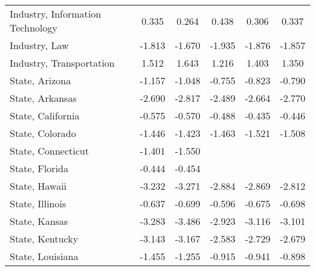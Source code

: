 {\begin{center}
{\begin{longtable}{l*{5}{c}}
\addlinespace
Industry, Information Technology&       0.335         &       0.264         &       0.438\sym{*}  &       0.306         &       0.337         \\
\addlinespace
Industry, Law            &      -1.813\sym{***}&      -1.670\sym{**} &      -1.935\sym{***}&      -1.876\sym{***}&      -1.857\sym{***}\\
\addlinespace
Industry, Transportation &       1.512\sym{*}  &       1.643\sym{**} &       1.216         &       1.403\sym{*}  &       1.350\sym{*}  \\
\addlinespace
State, Arizona           &      -1.157\sym{**} &      -1.048\sym{**} &      -0.755         &      -0.823\sym{*}  &      -0.790         \\
\addlinespace
State, Arkansas          &      -2.690\sym{***}&      -2.817\sym{***}&      -2.489\sym{***}&      -2.664\sym{***}&      -2.770\sym{***}\\
\addlinespace
State, California        &      -0.575\sym{*}  &      -0.570\sym{**} &      -0.488\sym{*}  &      -0.435         &      -0.446         \\
\addlinespace
State, Colorado          &      -1.446\sym{**} &      -1.423\sym{**} &      -1.463\sym{**} &      -1.521\sym{***}&      -1.508\sym{***}\\
\addlinespace
State, Connecticut       &      -1.401         &      -1.550         &                     &                     &                     \\
\addlinespace
State, Florida           &      -0.444         &      -0.454         &                     &                     &                     \\
\addlinespace
State, Hawaii            &      -3.232\sym{***}&      -3.271\sym{***}&      -2.884\sym{***}&      -2.869\sym{***}&      -2.812\sym{***}\\
\addlinespace
State, Illinois          &      -0.637         &      -0.699\sym{*}  &      -0.596         &      -0.675\sym{*}  &      -0.698\sym{*}  \\
\addlinespace
State, Kansas            &      -3.283\sym{**} &      -3.486\sym{**} &      -2.923\sym{*}  &      -3.116\sym{**} &      -3.101\sym{*}  \\
\addlinespace
State, Kentucky          &      -3.143\sym{***}&      -3.167\sym{***}&      -2.583\sym{***}&      -2.729\sym{***}&      -2.679\sym{***}\\
\addlinespace
State, Louisiana         &      -1.455\sym{*}  &      -1.255\sym{*}  &      -0.915         &      -0.941         &      -0.898         \\

\end{longtable}}
\end{center}}
